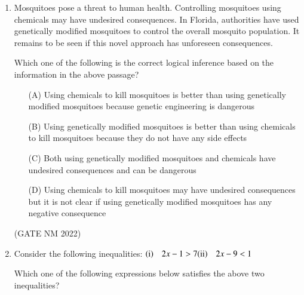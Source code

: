 \documentclass[journal,12pt,onecolumn]{IEEEtran}
\theoremstyle{remark}
\begin{document}
\begin{enumerate}
\begin{multicols}{4}

\begin{enumerate}
    \item[(A)] P and Q
    \item[(B)] Q
    \item[(C)] Q and S
    \item[(D)] R and S
\end{enumerate}

\end{multicols}

\hfill(GATE NM 2022)





\item  Mosquitoes pose a threat to human health. Controlling mosquitoes using chemicals may have undesired consequences. In Florida, authorities have used genetically modified mosquitoes to control the overall mosquito population. It remains to be seen if this novel approach has unforeseen consequences.  

Which one of the following is the correct logical inference based on the information in the above passage?  

\begin{enumerate}
    \item[(A)] Using chemicals to kill mosquitoes is better than using genetically modified mosquitoes because genetic engineering is dangerous
    \item[(B)] Using genetically modified mosquitoes is better than using chemicals to kill mosquitoes because they do not have any side effects
    \item[(C)] Both using genetically modified mosquitoes and chemicals have undesired consequences and can be dangerous
    \item[(D)] Using chemicals to kill mosquitoes may have undesired consequences but it is not clear if using genetically modified mosquitoes has any negative consequence
\end{enumerate}

\hfill(GATE NM 2022)



\item  Consider the following inequalities:  
$	
    \text{(i)} \quad   2x - 1 > 7 \\
 \text{(ii)} \quad   2x - 9 < 1
$

Which one of the following expressions below satisfies the above two inequalities? 


\end{enumerate}
\end{document}
